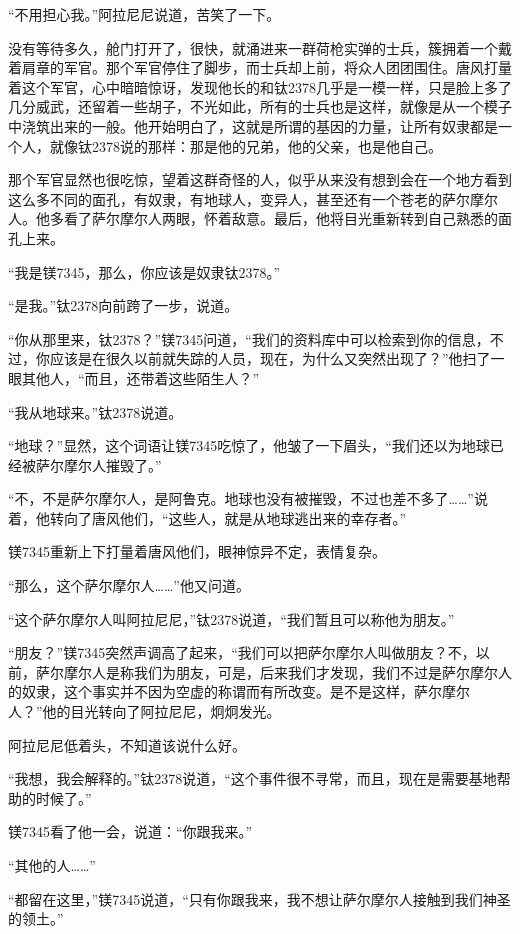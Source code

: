 “不用担心我。”阿拉尼尼说道，苦笑了一下。 

没有等待多久，舱门打开了，很快，就涌进来一群荷枪实弹的士兵，簇拥着一个戴着肩章的军官。那个军官停住了脚步，而士兵却上前，将众人团团围住。唐风打量着这个军官，心中暗暗惊讶，发现他长的和钛2378几乎是一模一样，只是脸上多了几分威武，还留着一些胡子，不光如此，所有的士兵也是这样，就像是从一个模子中浇筑出来的一般。他开始明白了，这就是所谓的基因的力量，让所有奴隶都是一个人，就像钛2378说的那样：那是他的兄弟，他的父亲，也是他自己。 

那个军官显然也很吃惊，望着这群奇怪的人，似乎从来没有想到会在一个地方看到这么多不同的面孔，有奴隶，有地球人，变异人，甚至还有一个苍老的萨尔摩尔人。他多看了萨尔摩尔人两眼，怀着敌意。最后，他将目光重新转到自己熟悉的面孔上来。 

“我是镁7345，那么，你应该是奴隶钛2378。” 

“是我。”钛2378向前跨了一步，说道。 

“你从那里来，钛2378？”镁7345问道，“我们的资料库中可以检索到你的信息，不过，你应该是在很久以前就失踪的人员，现在，为什么又突然出现了？”他扫了一眼其他人，“而且，还带着这些陌生人？” 

“我从地球来。”钛2378说道。 

“地球？”显然，这个词语让镁7345吃惊了，他皱了一下眉头，“我们还以为地球已经被萨尔摩尔人摧毁了。” 

“不，不是萨尔摩尔人，是阿鲁克。地球也没有被摧毁，不过也差不多了……”说着，他转向了唐风他们，“这些人，就是从地球逃出来的幸存者。” 

镁7345重新上下打量着唐风他们，眼神惊异不定，表情复杂。 

“那么，这个萨尔摩尔人……”他又问道。 

“这个萨尔摩尔人叫阿拉尼尼，”钛2378说道，“我们暂且可以称他为朋友。” 

“朋友？”镁7345突然声调高了起来，“我们可以把萨尔摩尔人叫做朋友？不，以前，萨尔摩尔人是称我们为朋友，可是，后来我们才发现，我们不过是萨尔摩尔人的奴隶，这个事实并不因为空虚的称谓而有所改变。是不是这样，萨尔摩尔人？”他的目光转向了阿拉尼尼，炯炯发光。 

阿拉尼尼低着头，不知道该说什么好。 

“我想，我会解释的。”钛2378说道，“这个事件很不寻常，而且，现在是需要基地帮助的时候了。” 

镁7345看了他一会，说道：“你跟我来。” 

“其他的人……” 

“都留在这里，”镁7345说道，“只有你跟我来，我不想让萨尔摩尔人接触到我们神圣的领土。” 

